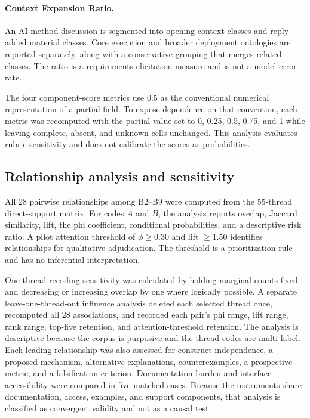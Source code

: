 \paragraph{Context Expansion Ratio.}
An AI-method discussion is segmented into opening context classes and reply-added material classes. Core execution and broader deployment ontologies are reported separately, along with a conservative grouping that merges related classes. The ratio is a requirements-elicitation measure and is not a model error rate.

The four component-score metrics use 0.5 as the conventional numerical representation of a partial field. To expose dependence on that convention, each metric was recomputed with the partial value set to 0, 0.25, 0.5, 0.75, and 1 while leaving complete, absent, and unknown cells unchanged. This analysis evaluates rubric sensitivity and does not calibrate the scores as probabilities.

\subsection{Relationship analysis and sensitivity}

All 28 pairwise relationships among B2--B9 were computed from the 55-thread direct-support matrix. For codes $A$ and $B$, the analysis reports overlap, Jaccard similarity, lift, the phi coefficient, conditional probabilities, and a descriptive risk ratio. A pilot attention threshold of $\phi\geq0.30$ and lift $\geq1.50$ identifies relationships for qualitative adjudication. The threshold is a prioritization rule and has no inferential interpretation.

One-thread recoding sensitivity was calculated by holding marginal counts fixed and decreasing or increasing overlap by one where logically possible. A separate leave-one-thread-out influence analysis deleted each selected thread once, recomputed all 28 associations, and recorded each pair's phi range, lift range, rank range, top-five retention, and attention-threshold retention. The analysis is descriptive because the corpus is purposive and the thread codes are multi-label. Each leading relationship was also assessed for construct independence, a proposed mechanism, alternative explanations, counterexamples, a prospective metric, and a falsification criterion. Documentation burden and interface accessibility were compared in five matched cases. Because the instruments share documentation, access, examples, and support components, that analysis is classified as convergent validity and not as a causal test.

